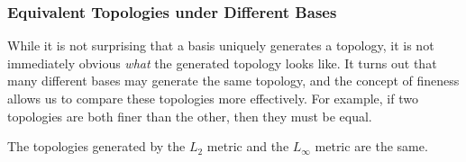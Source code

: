     \subsubsection{Equivalent Topologies under Different Bases} 

      While it is not surprising that a basis uniquely generates a topology, it is not immediately obvious \textit{what} the generated topology looks like. It turns out that many different bases may generate the same topology, and the concept of fineness allows us to compare these topologies more effectively. For example, if two topologies are both finer than the other, then they must be equal. 

      \begin{theorem} 
        The topologies generated by the $L_2$ metric and the $L_\infty$ metric are the same. 
      \end{theorem} 
